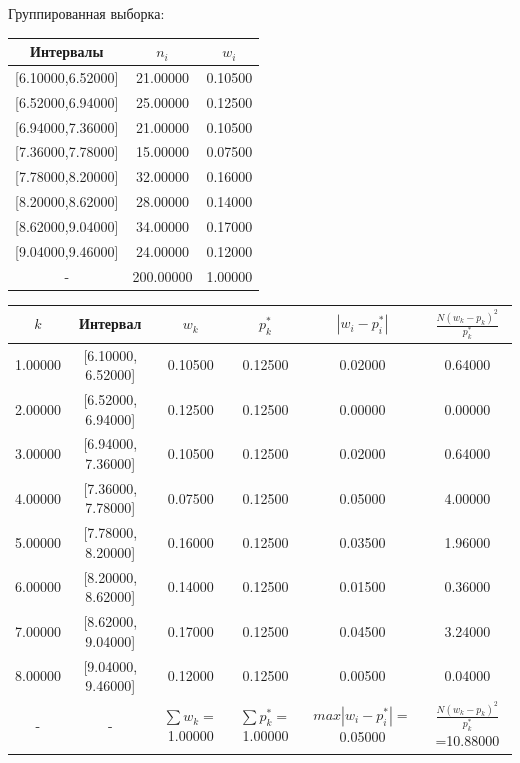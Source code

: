 \newpage%
Группированная выборка:\newline%
\newline%
%
\begin{tabular}{|c|c|c|}%
\hline%
Интервалы&$n_i$&$w_i$\\%
\hline%
{[}6.10000,6.52000{]}&21.00000&0.10500\\%
\hline%
{[}6.52000,6.94000{]}&25.00000&0.12500\\%
\hline%
{[}6.94000,7.36000{]}&21.00000&0.10500\\%
\hline%
{[}7.36000,7.78000{]}&15.00000&0.07500\\%
\hline%
{[}7.78000,8.20000{]}&32.00000&0.16000\\%
\hline%
{[}8.20000,8.62000{]}&28.00000&0.14000\\%
\hline%
{[}8.62000,9.04000{]}&34.00000&0.17000\\%
\hline%
{[}9.04000,9.46000{]}&24.00000&0.12000\\%
\hline%
{-}&200.00000&1.00000\\%
\hline%
\end{tabular}%
\newline%
\newline%
%
\begin{changemargin}{-4cm}{0cm}\small{%
\begin{tabular}{|c|c|c|c|c|c|}%
\hline%
$k$&Интервал&$w_k$&$p_{k}^*$&$|w_i-p_{i}^*|$&$\frac{N(w_k - p_k)^2}{p_{k}^*}$\\%
\hline%
1.00000&{[}6.10000, 6.52000{]}&0.10500&0.12500&0.02000&0.64000\\%
\hline%
2.00000&{[}6.52000, 6.94000{]}&0.12500&0.12500&0.00000&0.00000\\%
\hline%
3.00000&{[}6.94000, 7.36000{]}&0.10500&0.12500&0.02000&0.64000\\%
\hline%
4.00000&{[}7.36000, 7.78000{]}&0.07500&0.12500&0.05000&4.00000\\%
\hline%
5.00000&{[}7.78000, 8.20000{]}&0.16000&0.12500&0.03500&1.96000\\%
\hline%
6.00000&{[}8.20000, 8.62000{]}&0.14000&0.12500&0.01500&0.36000\\%
\hline%
7.00000&{[}8.62000, 9.04000{]}&0.17000&0.12500&0.04500&3.24000\\%
\hline%
8.00000&{[}9.04000, 9.46000{]}&0.12000&0.12500&0.00500&0.04000\\%
\hline%
{-}&{-}&$\sum w_k=$1.00000&$\sum p_{k}^*=$1.00000&$max | w_i - p_{i}^*|=$0.05000&$\frac{N(w_k - p_k)^2}{p_{k}^*}$=10.88000\\%
\hline%
\end{tabular}%
\newline%
\newline%
%
}\end{changemargin}%
